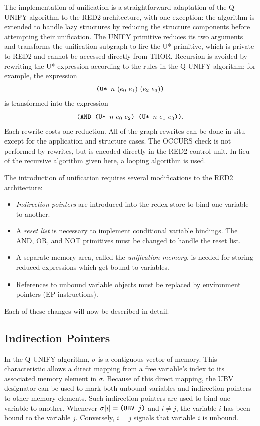 The implementation of unification is a straightforward adaptation of the
Q-UNIFY algorithm to the RED2 architecture, with one exception: the algorithm is
extended to handle lazy structures by reducing the structure components before
attempting their unification. The UNIFY primitive reduces its two arguments and
transforms the unification subgraph to fire the U* primitive, which is private
to RED2 and cannot be accessed directly from THOR. Recursion is avoided by
rewriting the U* expression according to the rules in the Q-UNIFY algorithm; for
example, the expression
\[
\THOR{(U* }n\ (e\sb{0}\ e\sb{1})\ (e\sb{2}\ e\sb{3})\THOR{)}
\]
is transformed into the expression
\[
\THOR{(AND (U* }n\ e\sb{0}\ e\sb{2}\THOR{) (U* }n\ e\sb{1}\ e\sb{3}\THOR{))}.
\]
Each rewrite costs one reduction. All of the graph rewrites can be done in situ
except for the application and structure cases. The OCCURS check is not
performed by rewrites, but is encoded directly in the RED2 control unit. In
lieu of the recursive algorithm given here, a looping algorithm is used.

The introduction of unification requires several modifications to the RED2
architecture:

\begin{itemize}
\item \emph{Indirection pointers} are introduced into the redex store to bind one
variable to another.
\item A \emph{reset list} is necessary to implement conditional variable bindings. The
AND, OR, and NOT primitives must be changed to handle the reset list.
\item A separate memory area, called the \emph{unification memory}, is needed for
storing reduced expressions which get bound to variables.
\item References to unbound variable objects must be replaced by environment
pointers (EP instructions).
\end{itemize}

Each of these changes will now be described in detail.

\subsection{Indirection Pointers}

In the Q-UNIFY algorithm, \(\sigma\) is a contiguous vector of memory. This
characteristic allows a direct mapping from a free variable's index to its
associated memory element in \(\sigma\). Because of this direct mapping, the UBV
designator can be used to mark both unbound variables and indirection pointers
to other memory elements. Such indirection pointers are used to bind one
variable to another. Whenever \(\sigma[i]=\texttt{(UBV }j\texttt{)}\) and
\(i\ne j\), the variable \(i\) has been bound to the variable \(j\). Conversely,
\(i=j\) signals that variable \(i\) is unbound.

